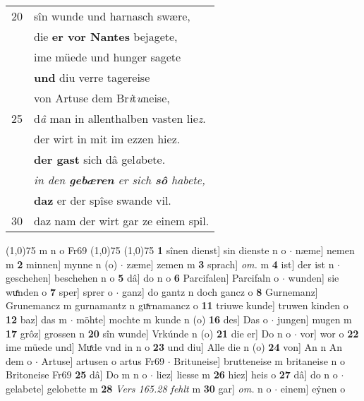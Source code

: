 \documentclass[8pt,a4paper,notitlepage]{article}
\begin{document}
\begin{table}[ht]
\begin{minipage}[t]{0.5\linewidth}
\begin{tabular}{rl}
20 & sîn wunde und harnasch swære,\\ 
 & die \textbf{er vor Nantes} bejagete,\\ 
 & ime müede und hunger sagete\\ 
 & \textbf{und} diu verre tagereise\\ 
 & von Artuse dem Br\textit{i}t\textit{u}neise,\\ 
25 & d\textit{â} man in allenthalben vasten lie\textit{z}.\\ 
 & der wirt in mit im ezzen hiez.\\ 
 & \textbf{der gast} sich dâ gel\textit{a}bete.\\ 
 & \textit{in den \textbf{gebæren} er sich \textbf{sô} habete,}\\ 
 & \textbf{daz} er der spîse swande vil.\\ 
30 & daz nam der wirt gar ze einem spil.\\ 
\end{tabular}
\scriptsize
\line(1,0){75} \newline
m n o Fr69 \newline
\line(1,0){75} \newline
\newline
\line(1,0){75} \newline
\textbf{1} sînen dienst] sin dienste n o  $\cdot$ næme] nemen m \textbf{2} minnen] mynne n (o)  $\cdot$ zæme] zemen m \textbf{3} sprach] \textit{om.} m \textbf{4} ist] der ist n  $\cdot$ geschehen] beschehen n o \textbf{5} dâ] do n o \textbf{6} Parcifalen] Parcifaln o  $\cdot$ wunden] sie wuͯnden o \textbf{7} sper] sprer o  $\cdot$ ganz] do gantz n doch gancz o \textbf{8} Gurnemanz] Grunemancz m gurnamantz n guͯrnamancz o \textbf{11} triuwe kunde] truwen kinden o \textbf{12} baz] das m  $\cdot$ möhte] mochte m kunde n (o) \textbf{16} des] Das o  $\cdot$ jungen] mugen m \textbf{17} grôz] grossen n \textbf{20} sîn wunde] Vrkúnde n (o) \textbf{21} die er] Do n o  $\cdot$ vor] wor o \textbf{22} ime müede und] Muͯde vnd in n o \textbf{23} und diu] Alle die n (o) \textbf{24} von] An n An dem o  $\cdot$ Artuse] artusen o artus Fr69  $\cdot$ Brituneise] brutteneise m britaneise n o Britoneise Fr69 \textbf{25} dâ] Do m n o  $\cdot$ liez] liesse m \textbf{26} hiez] heis o \textbf{27} dâ] do n o  $\cdot$ gelabete] gelobette m \textbf{28} \textit{Vers 165.28 fehlt} m  \textbf{30} gar] \textit{om.} n o  $\cdot$ einem] eẏnen o \newline
\end{minipage}
\end{table}
\end{document}
